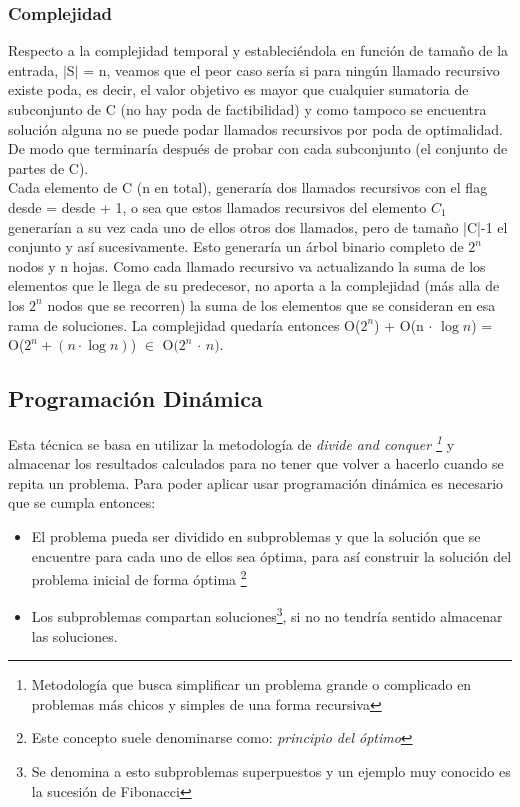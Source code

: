 \documentclass[8pt,a4paper]{article}
\begin{document}
\subsubsection{Complejidad}

Respecto a la complejidad temporal y estableciéndola en función de tamaño de la entrada, $|$S$|$ = n, veamos que el peor caso sería si para ningún llamado recursivo existe poda, es decir, el valor objetivo es mayor que cualquier sumatoria de subconjunto de C (no hay poda de factibilidad) y como tampoco se encuentra solución alguna no se puede podar llamados recursivos por poda de optimalidad. De modo que terminaría después de probar con cada subconjunto (el conjunto de partes de C).\\
Cada elemento de C (n en total), generaría dos llamados recursivos con el flag desde = desde + 1, o sea que estos llamados recursivos del elemento $C_{1}$ generarían a su vez cada uno de ellos otros dos llamados, pero de tamaño |C|-1 el conjunto y así sucesivamente. Esto generaría un árbol binario completo de $2^n$ nodos y n hojas. Como cada llamado recursivo va actualizando la suma de los elementos que le llega de su predecesor, no aporta a la complejidad (más alla de los $2^{n}$ nodos que se recorren) la suma de los elementos que se consideran en esa rama de soluciones. La complejidad quedaría entonces O($2^{n}$) + O(n $\cdot$ $\log{n}$) = O($2^{n} + (n \cdot \log{n})$) $\in$ O$(2^{n}$ $\cdot$ $n)$.



\subsection{Programación Dinámica}

Esta técnica se basa en utilizar la metodología de {\it divide and conquer \footnote{Metodología que busca simplificar un problema grande o complicado en problemas más chicos y simples de una forma recursiva}} y almacenar los resultados calculados para no tener que volver a hacerlo cuando se repita un problema. Para poder aplicar usar programación dinámica es necesario que se cumpla entonces: 
\begin{itemize}
	\item
	El problema pueda ser dividido en subproblemas y que la solución que se encuentre para cada uno de ellos sea óptima, para así construir la solución del problema inicial de forma óptima \footnote{Este concepto suele denominarse como: {\it principio del óptimo}}
	
	\item 	
	Los subproblemas compartan soluciones\footnote{Se denomina a esto subproblemas superpuestos y un ejemplo muy conocido es la sucesión de Fibonacci}, si no no tendría sentido almacenar las soluciones.
\end{itemize}
\end{document}
